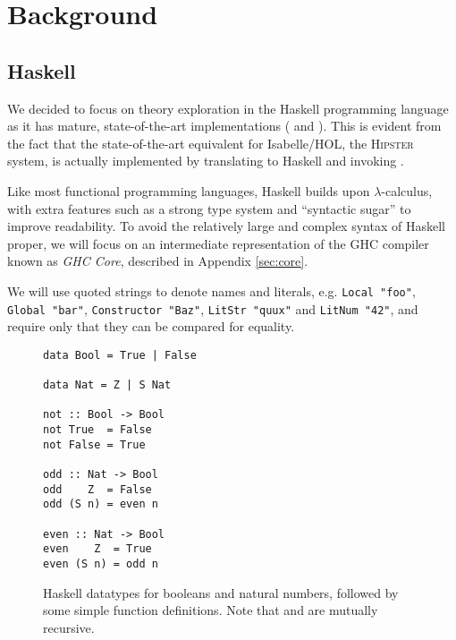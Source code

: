 \section{Background}
\label{sec:background}

\subsection{Haskell}
\label{sec:haskell}

\newcommand{\CVar}{\texttt{Var}}
\newcommand{\CLit}{\texttt{Lit}}
\newcommand{\CApp}{\texttt{App}}
\newcommand{\CLam}{\texttt{Lam}}
\newcommand{\CLet}{\texttt{Let}}
\newcommand{\CCase}{\texttt{Case}}
\newcommand{\CType}{\texttt{Type}}
\newcommand{\CLocal}{\texttt{Local}}
\newcommand{\CGlobal}{\texttt{Global}}
\newcommand{\CConstructor}{\texttt{Constructor}}
\newcommand{\CLitNum}{\texttt{LitNum}}
\newcommand{\CLitStr}{\texttt{LitStr}}
\newcommand{\CAlt}{\texttt{Alt}}
\newcommand{\CDataAlt}{\texttt{DataAlt}}
\newcommand{\CLitAlt}{\texttt{LitAlt}}
\newcommand{\CDefault}{\texttt{Default}}
\newcommand{\CNonRec}{\texttt{NonRec}}
\newcommand{\CRec}{\texttt{Rec}}
\newcommand{\CBind}{\texttt{Bind}}

We decided to focus on theory exploration in the Haskell programming language as it has mature, state-of-the-art implementations (\qspec{} \cite{QuickSpec} and \hspec{} \cite{claessen2013automating}). This is evident from the fact that the state-of-the-art equivalent for Isabelle/HOL, the \textsc{Hipster} \cite{Hipster} system, is actually implemented by translating to Haskell and invoking \hspec{}.

Like most functional programming languages, Haskell builds upon $\lambda$-calculus, with extra features such as a strong type system and ``syntactic sugar'' to improve readability. To avoid the relatively large and complex syntax of Haskell proper, we will focus on an intermediate representation of the \textsc{GHC} compiler known as \emph{GHC Core}, described in Appendix \ref{sec:core}.

We will use quoted strings to denote names and literals, e.g. \texttt{Local "foo"}, \texttt{Global "bar"}, \texttt{Constructor "Baz"}, \texttt{LitStr "quux"} and \texttt{LitNum "42"}, and require only that they can be compared for equality.

\begin{figure}
  \begin{haskell}\begin{verbatim}
data Bool = True | False

data Nat = Z | S Nat

not :: Bool -> Bool
not True  = False
not False = True

odd :: Nat -> Bool
odd    Z  = False
odd (S n) = even n

even :: Nat -> Bool
even    Z  = True
even (S n) = odd n\end{verbatim}
  \end{haskell}
  \caption{Haskell datatypes for booleans and natural numbers, followed by some simple function definitions. Note that  and  are mutually recursive.}
  \label{fig:haskellexample}
\end{figure}


